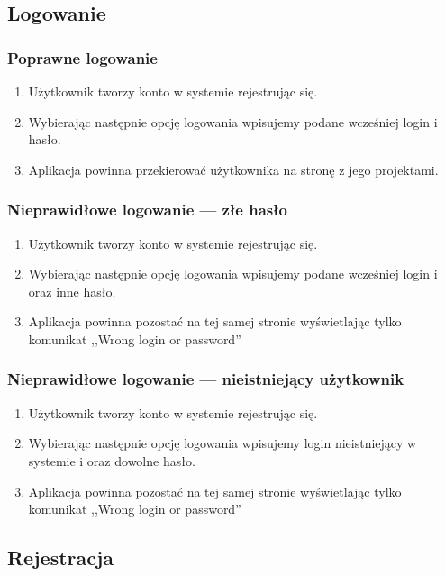 \documentclass[a4paper,12pt,notitlepage]{mwrep}
\begin{document}
\subsection{Logowanie}
\subsubsection{Poprawne logowanie}
\begin{enumerate}
	\item	Użytkownik tworzy konto w systemie rejestrując się.
	\item	Wybierając następnie opcję logowania wpisujemy podane wcześniej login i hasło.
	\item	Aplikacja powinna przekierować użytkownika na stronę z jego projektami.
\end{enumerate}

\subsubsection{Nieprawidłowe logowanie --- złe hasło}
\begin{enumerate}
	\item	Użytkownik tworzy konto w systemie rejestrując się.
	\item	Wybierając następnie opcję logowania wpisujemy podane wcześniej login i oraz inne hasło.
	\item	Aplikacja powinna pozostać na tej samej stronie wyświetlając tylko komunikat
		,,Wrong login or password''
\end{enumerate}

\subsubsection{Nieprawidłowe logowanie --- nieistniejący użytkownik}
\begin{enumerate}
	\item	Użytkownik tworzy konto w systemie rejestrując się.
	\item	Wybierając następnie opcję logowania wpisujemy login nieistniejący w systemie i oraz dowolne hasło.
	\item	Aplikacja powinna pozostać na tej samej stronie wyświetlając tylko komunikat
		,,Wrong login or password''
\end{enumerate}


\subsection{Rejestracja}
\end{document}
